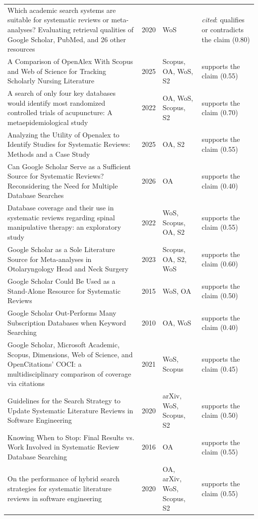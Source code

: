 \begin{longtable}{@{}%
  >{\raggedright\arraybackslash}p{}c%
  >{\raggedright\arraybackslash}p{}%
  >{\raggedright\arraybackslash}p{}@{}}
Which academic search systems are suitable for systematic reviews or meta-analyses? Evaluating retrieval qualities of Google Scholar, PubMed, and 26 other resources & 2020 & WoS & \emph{cited}: qualifies or contradicts the claim (0.80) \\
A Comparison of OpenAlex With Scopus and Web of Science for Tracking Scholarly Nursing Literature & 2025 & Scopus, OA, WoS, S2 & supports the claim (0.55) \\
A search of only four key databases would identify most randomized controlled trials of acupuncture: A metaepidemiological study & 2022 & OA, WoS, Scopus, S2 & supports the claim (0.70) \\
Analyzing the Utility of Openalex to Identify Studies for Systematic Reviews: Methods and a Case Study & 2025 & OA, S2 & supports the claim (0.55) \\
Can Google Scholar Serve as a Sufficient Source for Systematic Reviews? Reconsidering the Need for Multiple Database Searches & 2026 & OA & supports the claim (0.40) \\
Database coverage and their use in systematic reviews regarding spinal manipulative therapy: an exploratory study & 2022 & WoS, Scopus, OA, S2 & supports the claim (0.55) \\
Google Scholar as a Sole Literature Source for Meta-analyses in Otolaryngology Head and Neck Surgery & 2023 & Scopus, OA, S2, WoS & supports the claim (0.60) \\
Google Scholar Could Be Used as a Stand-Alone Resource for Systematic Reviews & 2015 & WoS, OA & supports the claim (0.50) \\
Google Scholar Out-Performs Many Subscription Databases when Keyword Searching & 2010 & OA, WoS & supports the claim (0.40) \\
Google Scholar, Microsoft Academic, Scopus, Dimensions, Web of Science, and OpenCitations' COCI: a multidisciplinary comparison of coverage via citations & 2021 & WoS, Scopus & supports the claim (0.45) \\
Guidelines for the Search Strategy to Update Systematic Literature Reviews in Software Engineering & 2020 & arXiv, WoS, Scopus, S2 & supports the claim (0.50) \\
Knowing When to Stop: Final Results vs. Work Involved in Systematic Review Database Searching & 2016 & OA & supports the claim (0.55) \\
On the performance of hybrid search strategies for systematic literature reviews in software engineering & 2020 & OA, arXiv, WoS, Scopus, S2 & supports the claim (0.55) \\

\end{longtable}
